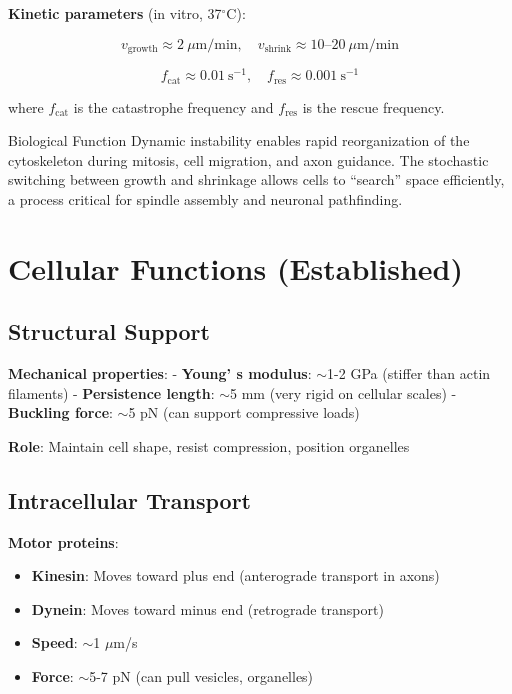 \textbf{Kinetic parameters} (in vitro, 37$^\circ$C):

\begin{equation}
v_{\text{growth}} \approx 2~\mu\text{m/min}, \quad v_{\text{shrink}} \approx 10\text{--}20~\mu\text{m/min}
\label{eq:growth-shrink-rates}
\end{equation}

\begin{equation}
f_{\text{cat}} \approx 0.01~\text{s}^{-1}, \quad f_{\text{res}} \approx 0.001~\text{s}^{-1}
\label{eq:catastrophe-rescue-freq}
\end{equation}

where $f_{\text{cat}}$ is the catastrophe frequency and $f_{\text{res}}$ is the rescue frequency.

\begin{calloutbox}{Biological Function}
Dynamic instability enables rapid reorganization of the cytoskeleton during mitosis, cell migration, and axon guidance. The stochastic switching between growth and shrinkage allows cells to ``search'' space efficiently, a process critical for spindle assembly and neuronal pathfinding.
\end{calloutbox}

\section{Cellular Functions (Established)}
\label{sec:cellular-functions}

\subsection{Structural Support}\label{structural-support}

\textbf{Mechanical properties}: - \textbf{Young' s
modulus}: $\sim$1-2 GPa (stiffer than actin filaments) -
\textbf{Persistence length}: $\sim$5 mm (very rigid on cellular
scales) - \textbf{Buckling force}: $\sim$5 pN (can support
compressive loads)

\textbf{Role}: Maintain cell shape, resist compression, position
organelles

\subsection{Intracellular
Transport}\label{intracellular-transport}

\textbf{Motor proteins}:
\begin{itemize}
\item \textbf{Kinesin}: Moves toward plus end
(anterograde transport in axons)
\item \textbf{Dynein}: Moves toward minus
end (retrograde transport)
\item \textbf{Speed}: $\sim$1
$\mu$m/s
\item \textbf{Force}: $\sim$5-7 pN (can
pull vesicles, organelles)
\end{itemize}


